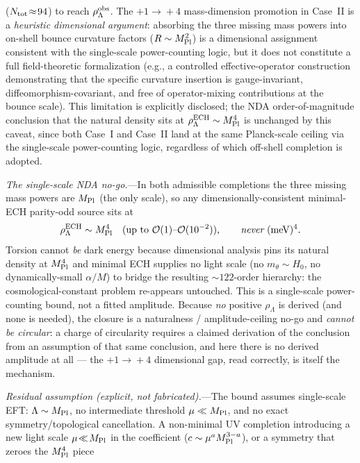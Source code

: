 \documentclass[aps,prd,twocolumn,superscriptaddress,showpacs,preprintnumbers,nofootinbib,longbibliography,floatfix]{revtex4-2}
\newcommand{\MPl}{M_{\rm Pl}}
\begin{document}
($N_{\rm tot}\!\approx\!94$) to reach $\rho_\Lambda^{\rm obs}$.
The $+1\!\to\!+4$ mass-dimension promotion in Case~II is a
\emph{heuristic dimensional argument}: absorbing the three missing mass powers
into on-shell bounce curvature factors ($R\sim\MPl^2$) is a
dimensional assignment consistent with the single-scale power-counting logic,
but it does not constitute a full field-theoretic formalization (e.g.,
a controlled effective-operator construction demonstrating that the specific
curvature insertion is gauge-invariant, diffeomorphism-covariant, and free of
operator-mixing contributions at the bounce scale). This limitation is
explicitly disclosed; the NDA order-of-magnitude conclusion that the
natural density sits at $\rho_\Lambda^{\rm ECH}\sim\MPl^4$ is unchanged by
this caveat, since both Case~I and Case~II land at the same Planck-scale
ceiling via the single-scale power-counting logic, regardless of which
off-shell completion is adopted.
\par
\textit{The single-scale NDA no-go.}---In both admissible completions the
three missing mass powers are $\MPl$ (the only scale), so any
dimensionally-consistent minimal-ECH parity-odd source sits at
\begin{equation}
\rho_\Lambda^{\rm ECH}\sim\MPl^{4}\quad(\text{up to }\mathcal{O}(1)\text{--}\mathcal{O}(10^{-2})),
\qquad \emph{never}\ (\text{meV})^{4}.
\end{equation}
Torsion cannot \emph{be} dark energy because dimensional analysis pins its
natural density at $\MPl^{4}$ and minimal ECH supplies no light scale (no
$m_\theta\!\sim\!H_0$, no dynamically-small $\alpha/M$) to bridge the
resulting $\sim\!122$-order hierarchy: the cosmological-constant problem
re-appears untouched. This is a single-scale power-counting bound, not a
fitted amplitude. Because \emph{no} positive $\rho_\Lambda$ is derived
(and none is needed), the closure is a naturalness / amplitude-ceiling
no-go and \emph{cannot be circular}: a charge of circularity requires a
claimed derivation of the conclusion from an assumption of that same
conclusion, and here there is no derived amplitude at all --- the
$+1\!\to\!+4$ dimensional gap, read correctly, is itself the mechanism.
\par
\textit{Residual assumption (explicit, not fabricated).}---The bound assumes
single-scale EFT: $\Lambda\sim\MPl$, no intermediate threshold $\mu\ll\MPl$,
and no exact symmetry/topological cancellation. A non-minimal UV completion
introducing a new light scale $\mu\!\ll\!\MPl$ in the coefficient
($c\sim\mu^{a}\MPl^{3-a}$), or a symmetry that zeroes the $\MPl^{4}$ piece
\end{document}
